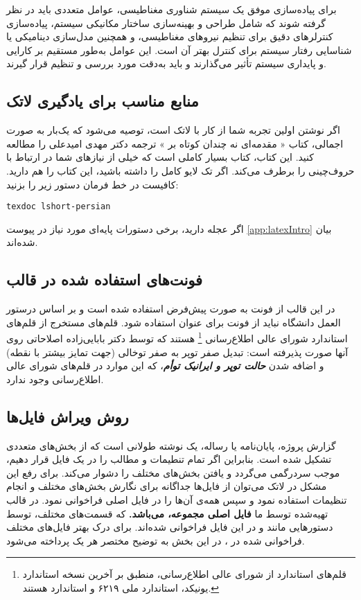 برای پیاده‌سازی موفق یک سیستم شناوری مغناطیسی، عوامل متعددی باید در نظر گرفته شوند که شامل طراحی و بهینه‌سازی ساختار مکانیکی سیستم، پیاده‌سازی کنترلرهای دقیق برای تنظیم نیروهای مغناطیسی، و همچنین مدل‌سازی دینامیکی یا شناسایی رفتار سیستم برای کنترل بهتر آن است. این عوامل به‌طور مستقیم بر کارایی و پایداری سیستم تأثیر می‌گذارند و باید به‌دقت مورد بررسی و تنظیم قرار گیرند.

\subsection{منابع مناسب برای یادگیری لاتک}
اگر نوشتن \پ اولین تجربه شما از کار با لاتک است، توصیه می‌شود که یک‌بار به صورت اجمالی، کتاب «%
مقدمه‌ای نه چندان کوتاه بر
\lr{\LaTeXe}%
»
ترجمه دکتر مهدی امیدعلی را مطالعه کنید. این کتاب، کتاب بسیار کاملی است که خیلی از نیازهای شما در ارتباط با حروف‌چینی را برطرف می‌کند.
اگر تک لایو کامل را داشته باشید، این کتاب را هم دارید. کافیست در خط فرمان دستور زیر را بزنید:
\begin{latin}
	\texttt{texdoc lshort-persian}
\end{latin}
اگر عجله دارید، برخی دستورات پایه‌ای مورد نیاز در پیوست \ref{app:latexIntro} بیان شده‌اند.


\subsection{فونت‌های استفاده شده در قالب}
در این قالب از فونت‌
به صورت پیش‌فرض استفاده شده است و بر اساس درستور العمل دانشگاه نباید از فونت
برای عنوان استفاده شود.
قلم‌های
مستخرج از قلم‌های استاندارد
شورای عالی اطلاع‌رسانی%
\footnote{
قلم‌های استاندارد
از شورای عالی اطلاع‌رسانی، منطبق بر آخرین نسخه استاندارد یونیکد، استاندارد ملی ۶۲۱۹ و استاندارد
هستند.
}
هستند که توسط دکتر بابایی‌زاده اصلاحاتی روی آنها صورت پذیرفته است: تبدیل صفر توپر به صفر توخالی (جهت تمایز بیشتر با نقطه) و اضافه شدن
\textit{\textbf{حالت توپر و ایرانیک توأم}}،
که این موارد در قلم‌های شورای عالی اطلاع‌رسانی وجود ندارد.


\subsection{روش ویراش فایل‌ها}\label{sec:edit}
گزارش پروژه، پایان‌نامه یا رساله، یک نوشته طولانی است که از بخش‌های متعددی تشکیل شده است. بنابراین اگر تمام تنطیمات و مطالب را در یک فایل قرار دهیم، موجب سردرگمی می‌گردد و یافتن بخش‌های مختلف را دشوار می‌کند. برای رفع این مشکل در لاتک می‌توان از فایل‌ها جداگانه برای نگارش بخش‌های مختلف و انجام تنظیمات استفاده نمود و سپس همه‌ی آن‌ها را در فایل اصلی فراخوانی نمود.
در قالب تهیه‌شده توسط ما  
\textbf{
	فایل اصلی مجموعه،
	می‌باشد.
}
که قسمت‌های مختلف، توسط دستورهایی مانند 
و
در این فایل فراخوانی شده‌اند.
برای درک بهتر فایل‌های مختلف فراخوانی شده در
،
در این بخش به توضیح مختصر هر یک پرداخته می‌شود.

